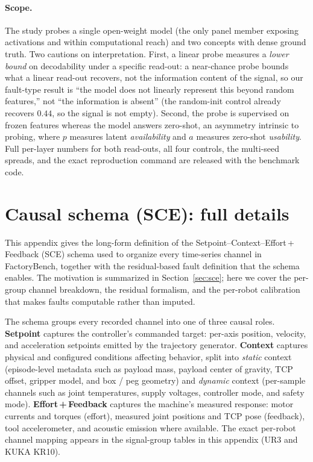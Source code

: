 \paragraph{Scope.} The study probes a single open-weight model (the only panel member exposing activations and within computational reach) and two concepts with dense ground truth. Two cautions on interpretation. First, a linear probe measures a \emph{lower bound} on decodability under a specific read-out: a near-chance probe bounds what a linear read-out recovers, not the information content of the signal, so our fault-type result is ``the model does not linearly represent this beyond random features,'' not ``the information is absent'' (the random-init control already recovers $0.44$, so the signal is not empty). Second, the probe is supervised on frozen features whereas the model answers zero-shot, an asymmetry intrinsic to probing, where $p$ measures latent \emph{availability} and $a$ measures zero-shot \emph{usability}. Full per-layer numbers for both read-outs, all four controls, the multi-seed spreads, and the exact reproduction command are released with the benchmark code.

\section{Causal schema (SCE): full details}
\label{app:sce}

This appendix gives the long-form definition of the Setpoint--Context--Effort\,+\,Feedback (SCE) schema used to organize every time-series channel in FactoryBench, together with the residual-based fault definition that the schema enables. The motivation is summarized in Section~\ref{sec:sce}; here we cover the per-group channel breakdown, the residual formalism, and the per-robot calibration that makes faults computable rather than imputed.

The schema groups every recorded channel into one of three causal roles. \textbf{Setpoint} captures the controller's commanded target: per-axis position, velocity, and acceleration setpoints emitted by the trajectory generator. \textbf{Context} captures physical and configured conditions affecting behavior, split into \emph{static} context (episode-level metadata such as payload mass, payload center of gravity, TCP offset, gripper model, and box / peg geometry) and \emph{dynamic} context (per-sample channels such as joint temperatures, supply voltages, controller mode, and safety mode). \textbf{Effort\,+\,Feedback} captures the machine's measured response: motor currents and torques (effort), measured joint positions and TCP pose (feedback), tool accelerometer, and acoustic emission where available. The exact per-robot channel mapping appears in the signal-group tables in this appendix (UR3 and KUKA KR10).

